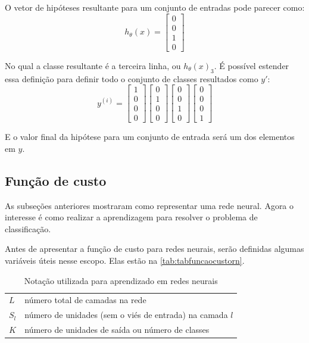 O vetor de hipóteses resultante para um conjunto de entradas pode parecer como:
\begin{equation}
h_{\theta}(x) = \begin{bmatrix} 0 \\ 0 \\ 1 \\ 0 \end{bmatrix} \nonumber
\end{equation}

No qual a classe resultante é a terceira linha, ou $h_{\theta}(x)_3$. É possível estender essa definição para definir todo o conjunto de classes resultados como $y'$:
\begin{equation}
y^{(i)} = \begin{bmatrix} 1 \\ 0 \\ 0 \\ 0 \end{bmatrix} \begin{bmatrix} 0 \\ 1 \\ 0 \\ 0 \end{bmatrix} \begin{bmatrix} 0 \\ 0 \\ 1 \\ 0 \end{bmatrix} \begin{bmatrix} 0 \\ 0 \\ 0 \\ 1 \end{bmatrix} \nonumber
\end{equation}

E o valor final da hipótese para um conjunto de entrada será um dos elementos em $y$.


\subsection{Função de custo}

As subseções anteriores mostraram como representar uma rede neural. Agora o interesse é como realizar a aprendizagem para resolver o problema de classificação.

Antes de apresentar a função de custo para redes neurais, serão definidas algumas variáveis úteis nesse escopo. Elas estão na \autoref{tab:tabfuncaocustorn}.

\begin{table}[!htb]
\begin{center}
\caption{Notação utilizada para aprendizado em redes neurais} \label{tab:tabfuncaocustorn}
\begin{tabular}{m{2cm}m{12.0cm}}
  \toprule
  $L$ 	& número total de camadas na rede\\
  $S_l$	& número de unidades (sem o viés de entrada) na camada $l$ \\
  $K$   & número de unidades de saída ou número de classes  \\
  \bottomrule
\end{tabular}
\end{center}
\end{table}

